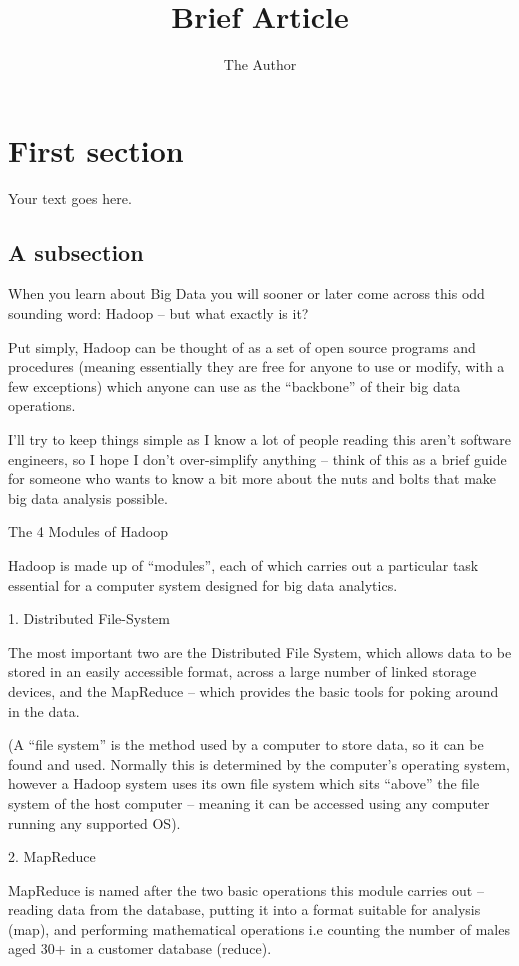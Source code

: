 \documentclass[11pt]{article} %
\title{Brief Article}
\author{The Author}
\begin{document}
\maketitle

\section{First section}

Your text goes here.

\subsection{A subsection}
When you learn about Big Data you will sooner or later come across this odd sounding word: Hadoop – but what exactly is it?

Put simply, Hadoop can be thought of as a set of open source programs and procedures (meaning essentially they are free for anyone to use or modify, with a few exceptions) which anyone can use as the “backbone” of their big data operations.

I’ll try to keep things simple as I know a lot of people reading this aren’t software engineers, so I hope I don’t over-simplify anything – think of this as a brief guide for someone who wants to know a bit more about the nuts and bolts that make big data analysis possible.

The 4 Modules of Hadoop

Hadoop is made up of “modules”, each of which carries out a particular task essential for a computer system designed for big data analytics.

1. Distributed File-System

The most important two are the Distributed File System, which allows data to be stored in an easily accessible format, across a large number of linked storage devices, and the MapReduce – which provides the basic tools for poking around in the data.

(A “file system” is the method used by a computer to store data, so it can be found and used. Normally this is determined by the computer’s operating system, however a Hadoop system uses its own file system which sits “above” the file system of the host computer – meaning it can be accessed using any computer running any supported OS).

2. MapReduce

MapReduce is named after the two basic operations this module carries out – reading data from the database, putting it into a format suitable for analysis (map), and performing mathematical operations i.e counting the number of males aged 30+ in a customer database (reduce).
\end{document}
